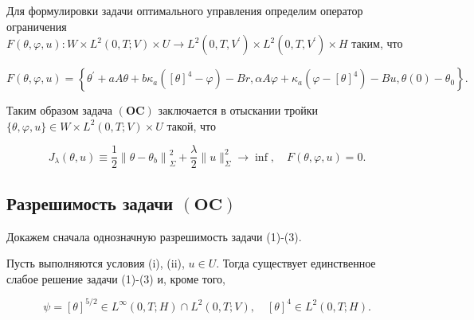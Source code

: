 Для формулировки задачи оптимального управления определим оператор ограничения
$F(\theta, \varphi, u): W \times L^{2}(0, T; V) \times U
\rightarrow L^{2} \left(0, T, V^{\prime}\right)
\times L^{2}\left(0, T, V^{\prime}\right) \times H$ таким, что

\[
    F(\theta, \varphi, u)=\left\{\theta^{\prime}+a A
    \theta+b \kappa_{a}\left([\theta]^{4}-\varphi\right)-B r,
    \alpha A \varphi+\kappa_{a}\left(\varphi-[\theta]^{4}\right)-B u, \theta(0)-\theta_{0}\right\}.
\]

Таким образом задача $(\mathbf{OC})$ заключается в отыскании тройки
$\{\theta, \varphi, u\} \in W \times L^{2}(0, T ; V) \times U$ такой, что

\[
    J_{\lambda}(\theta, u) \equiv \frac{1}{2}\left\|\theta-\theta_{b}\right\|_{\Sigma}^{2}+
    \frac{\lambda}{2}\|u\|_{\Sigma}^{2} \rightarrow \inf , \quad F(\theta, \varphi, u)=0.
\]

\subsection{Разрешимость задачи $(\mathbf{OC})$}\label{subsec:ch2/sec3/subsec3}
Докажем сначала однозначную разрешимость задачи (1)-(3).

\begin{lemma}
    \label{lm:2_3:1}
    Пусть выполняются условия (i), (ii), $u \in U$.
    Тогда существует единственное слабое решение задачи (1)-(3) и, кроме того,

    \[
        \psi=[\theta]^{5 / 2} \in L^{\infty}(0, T; H) \cap L^{2}(0, T ; V),
        \quad[\theta]^{4} \in L^{2}(0, T ; H).
    \]
\end{lemma}

